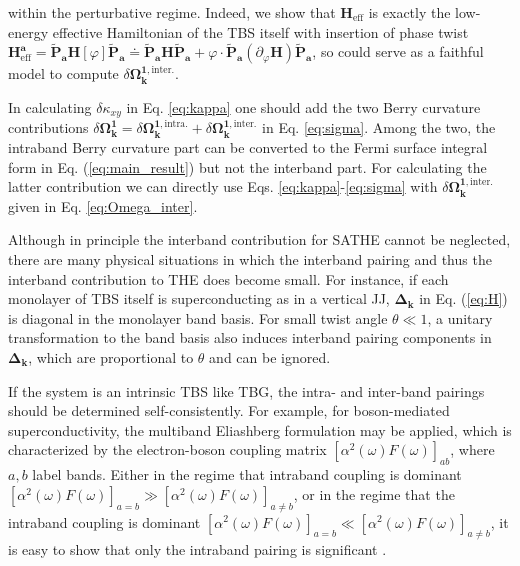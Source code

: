 within the perturbative regime. Indeed, we show that $\mathbf H_{\text{eff}}$ is exactly the low-energy effective Hamiltonian of the TBS itself with insertion of phase twist \cite{SM} $\mathbf H_{\text{eff}}^{\mathbf a}=\widetilde{\mathbf P}_{\mathbf a}\mathbf H[\varphi]\widetilde{\mathbf P}_{\mathbf a}\doteq\widetilde{\mathbf P}_{\mathbf a}\mathbf H\widetilde{\mathbf P}_{\mathbf a}+\varphi\cdot\widetilde{\mathbf P}_{\mathbf a}(\partial_\varphi\mathbf H)\widetilde{\mathbf P}_{\mathbf a}$, so could serve as a faithful model to compute $\delta\mathbf\Omega_{\bm k}^{\mathbf 1,\text{inter.}}$.

In calculating $\delta \kappa_{xy}$ in Eq. \eqref{eq:kappa} one should add the two Berry curvature contributions $\delta \boldsymbol\Omega^{\mathbf 1}_{\bm{k}} = \delta \boldsymbol\Omega^{\mathbf 1,\text{intra.}}_{\bm{k}} + \delta \boldsymbol\Omega^{\mathbf 1,\text{inter.}}_{\bm{k}}$ in Eq. \eqref{eq:sigma}. Among the two, the intraband Berry curvature part can be converted to the Fermi surface integral form in Eq. (\ref{eq:main_result}) but not the interband part. For calculating the latter contribution we can directly use Eqs. \eqref{eq:kappa}-\eqref{eq:sigma} with $\delta \boldsymbol\Omega^{\mathbf 1,\text{inter.}}_{\bm{k}}$ given in Eq. \eqref{eq:Omega_inter}.

Although in principle the interband contribution for SATHE cannot be neglected, there are many physical situations in which the interband pairing and thus the interband contribution to THE does become small. For instance, if each monolayer of TBS itself is superconducting as in a vertical JJ, $\boldsymbol\Delta_{\bm k}$ in Eq. (\ref{eq:H}) is diagonal in the monolayer band basis. For small twist angle $\theta\ll1$, a unitary transformation to the band basis also induces interband pairing components in $\boldsymbol\Delta_{\bm k}$, which are proportional to $\theta$ and can be ignored. 

If the system is an intrinsic TBS like TBG, the intra- and inter-band pairings should be determined self-consistently. For example, for boson-mediated superconductivity, the multiband Eliashberg formulation may be applied, which is characterized by the electron-boson coupling matrix $[\alpha^2(\omega)F(\omega)]_{ab}$, where $a,b$ label bands. Either in the regime that intraband coupling is dominant $[\alpha^2(\omega)F(\omega)]_{a=b}\gg [\alpha^2(\omega)F(\omega)]_{a\neq b}$, or in the regime that the intraband coupling is dominant $[\alpha^2(\omega)F(\omega)]_{a=b}\ll [\alpha^2(\omega)F(\omega)]_{a\neq b}$, it is easy to show that only the intraband pairing is significant \cite{dolgov2009interband}.

